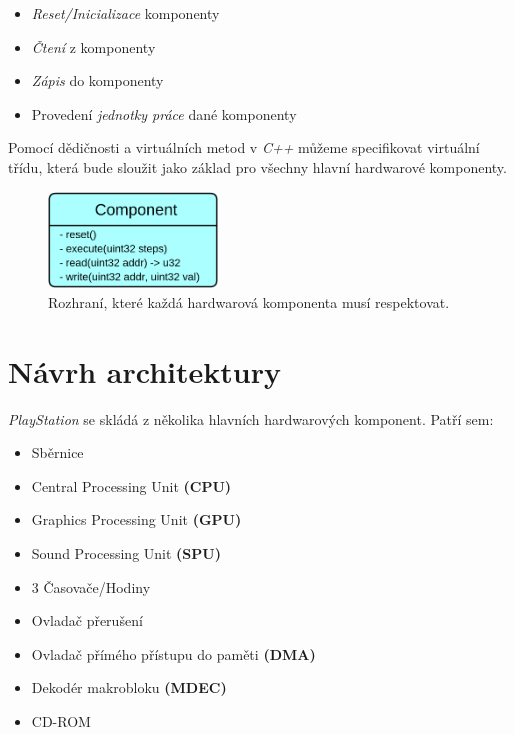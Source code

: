 \begin{itemize}
    \item{\textit{Reset/Inicializace} komponenty}
    \item{\textit{Čtení} z komponenty}
    \item{\textit{Zápis} do komponenty}
    \item{Provedení \textit{jednotky práce} dané komponenty}
\end{itemize}

Pomocí dědičnosti a virtuálních metod v \textit{C++} můžeme specifikovat virtuální třídu, která bude sloužit jako základ pro všechny hlavní hardwarové komponenty.

\begin{figure}[hbt]
    \centering
    \includegraphics[width=0.4\textwidth]{obrazky-figures/component.png}
    \caption{Rozhraní, které každá hardwarová komponenta musí respektovat.}
    \label{component}
\end{figure}

\section{Návrh architektury}

\textit{PlayStation} se skládá z několika hlavních hardwarových komponent. Patří sem\cite{PSXSpec}:

\begin{itemize}
    \item Sběrnice
    \item Central Processing Unit \textbf{(CPU)}
    \item Graphics Processing Unit \textbf{(GPU)}
    \item Sound Processing Unit \textbf{(SPU)}
    \item 3 Časovače/Hodiny
    \item Ovladač přerušení
    \item Ovladač přímého přístupu do paměti \textbf{(DMA)}
    \item Dekodér makrobloku \textbf{(MDEC)}
    \item CD-ROM
\end{itemize}

